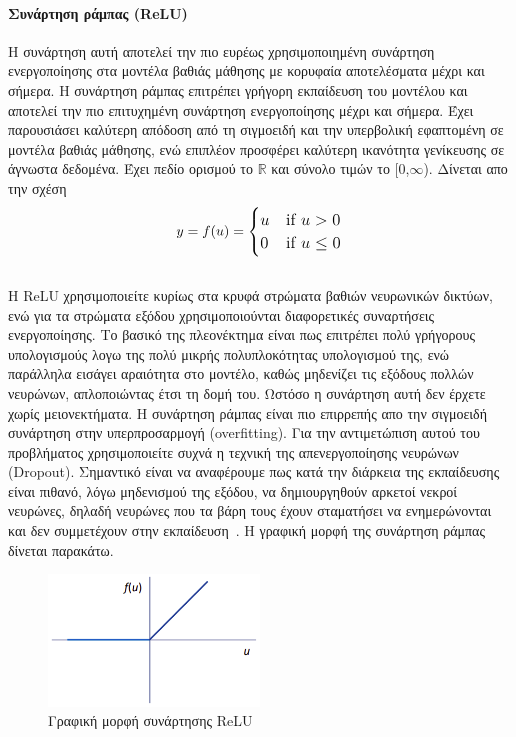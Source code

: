\documentclass[12pt]{article}
\numberwithin{equation}{section}
\begin{document}
\paragraph{Συνάρτηση ράμπας (ReLU)\\[0.5cm]}

Η συνάρτηση αυτή αποτελεί την πιο ευρέως χρησιμοποιημένη συνάρτηση ενεργοποίησης στα μοντέλα βαθιάς μάθησης με κορυφαία αποτελέσματα μέχρι και σήμερα. Η συνάρτηση ράμπας επιτρέπει γρήγορη εκπαίδευση του μοντέλου και αποτελεί την πιο επιτυχημένη συνάρτηση ενεργοποίησης μέχρι και σήμερα. Έχει παρουσιάσει καλύτερη απόδοση από τη σιγμοειδή και την υπερβολική εφαπτομένη σε μοντέλα βαθιάς μάθησης, ενώ επιπλέον προσφέρει καλύτερη ικανότητα γενίκευσης σε άγνωστα δεδομένα. Έχει πεδίο ορισμού το \(\mathbb{R}\) και σύνολο τιμών το [0,\(\infty\)). Δίνεται απο την σχέση \\ 

\begin{equation}
\large
y = f(u) =
\begin{cases}
u & \text{if } u > 0 \\
0 & \text{if } u \leq 0
\end{cases}
\end{equation} \\

Η ReLU χρησιμοποιείτε κυρίως στα κρυφά στρώματα βαθιών νευρωνικών δικτύων, ενώ για τα στρώματα εξόδου χρησιμοποιούνται διαφορετικές συναρτήσεις ενεργοποίησης. Το βασικό της πλεονέκτημα είναι πως επιτρέπει πολύ γρήγορους υπολογισμούς λογω της πολύ μικρής πολυπλοκότητας υπολογισμού της, ενώ παράλληλα εισάγει αραιότητα στο μοντέλο, καθώς μηδενίζει τις εξόδους πολλών νευρώνων, απλοποιώντας έτσι τη δομή του. Ωστόσο η συνάρτηση αυτή δεν έρχετε χωρίς μειονεκτήματα. Η συνάρτηση ράμπας είναι πιο επιρρεπής απο την σιγμοειδή συνάρτηση στην υπερπροσαρμογή (overfitting). Για την αντιμετώπιση αυτού του προβλήματος χρησιμοποιείτε συχνά η τεχνική της απενεργοποίησης νευρώνων (Dropout). Σημαντικό είναι να αναφέρουμε πως κατά την διάρκεια της εκπαίδευσης είναι πιθανό, λόγω μηδενισμού της εξόδου, να δημιουργηθούν αρκετοί νεκροί νευρώνες, δηλαδή νευρώνες που τα βάρη τους έχουν σταματήσει να ενημερώνονται και δεν συμμετέχουν στην εκπαίδευση~\cite{nwankpa2018activationfunctionscomparisontrends}.  Η γραφική μορφή της συνάρτηση ράμπας δίνεται παρακάτω. \\

\begin{figure}[h!]
  \centering
  \includegraphics[width=0.5\textwidth]{images/ReLU.png} %
  \caption{Γραφική μορφή συνάρτησης ReLU}
  \label{figure 14}
\end{figure} 
\end{document}
